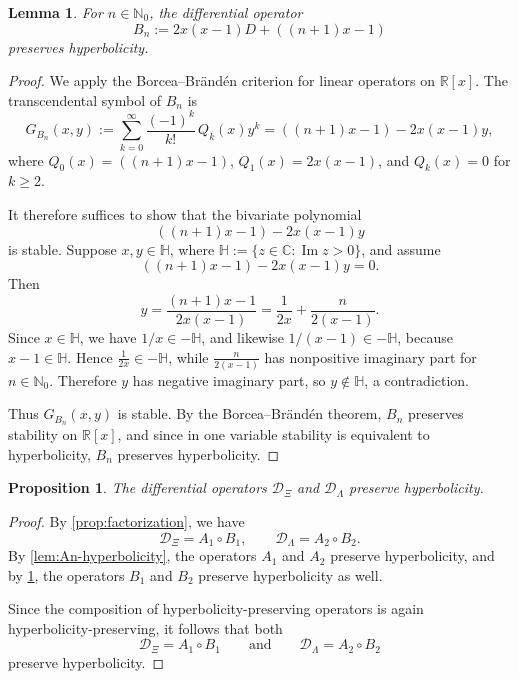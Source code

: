 \documentclass[11pt,twoside]{article}
\newtheorem{lemma}[theorem]{Lemma}
\newtheorem{proposition}[theorem]{Proposition}
\numberwithin{equation}{section}
\begin{document}
\begin{lemma}\label{lem:Bn-hyperbolicity}
For \(n\in\mathbb{N}_0\), the differential operator
\[
B_n:=2x(x-1)D+((n+1)x-1)
\]
preserves hyperbolicity.
\end{lemma}

\begin{proof}
We apply the Borcea--Br\"and\'en criterion for linear operators on \(\mathbb R[x]\). The transcendental symbol of \(B_n\) is
\[
G_{B_n}(x,y)
:=
\sum_{k=0}^\infty \frac{(-1)^k}{k!}\,Q_k(x)y^k
=
((n+1)x-1)-2x(x-1)y,
\]
where \(Q_0(x)=((n+1)x-1)\), \(Q_1(x)=2x(x-1)\), and \(Q_k(x)=0\) for \(k\ge2\).

It therefore suffices to show that the bivariate polynomial
\[
((n+1)x-1)-2x(x-1)y
\]
is stable. Suppose \(x,y\in\mathbb H\), where \(\mathbb H:=\{z\in\mathbb C:\operatorname{Im} z>0\}\), and assume
\[
((n+1)x-1)-2x(x-1)y=0.
\]
Then
\[
y=\frac{(n+1)x-1}{2x(x-1)}
=
\frac{1}{2x}+\frac{n}{2(x-1)}.
\]
Since \(x\in\mathbb H\), we have \(1/x\in-\mathbb H\), and likewise \(1/(x-1)\in-\mathbb H\), because \(x-1\in\mathbb H\). Hence \(\frac{1}{2x}\in-\mathbb H\), while \(\frac{n}{2(x-1)}\) has nonpositive imaginary part for \(n\in\mathbb N_0\). Therefore \(y\) has negative imaginary part, so \(y\notin\mathbb H\), a contradiction.

Thus \(G_{B_n}(x,y)\) is stable. By the Borcea--Br\"and\'en theorem, \(B_n\) preserves stability on \(\mathbb{R}[x]\), and since in one variable stability is equivalent to hyperbolicity, \(B_n\) preserves hyperbolicity.
\end{proof}

\begin{proposition}\label{prop:D-hyperbolicity}
The differential operators \(\mathcal D_{\Xi}\) and \(\mathcal D_{\Lambda}\) preserve hyperbolicity.
\end{proposition}

\begin{proof}
By \cref{prop:factorization}, we have
\[
\mathcal D_{\Xi}=A_1\circ B_1,
\qquad
\mathcal D_{\Lambda}=A_2\circ B_2.
\]
By \cref{lem:An-hyperbolicity}, the operators \(A_1\) and \(A_2\) preserve hyperbolicity, and by \cref{lem:Bn-hyperbolicity}, the operators \(B_1\) and \(B_2\) preserve hyperbolicity as well.

Since the composition of hyperbolicity-preserving operators is again hyperbolicity-preserving, it follows that both
\[
\mathcal D_{\Xi}=A_1\circ B_1
\qquad\text{and}\qquad
\mathcal D_{\Lambda}=A_2\circ B_2
\]
preserve hyperbolicity.
\end{proof}
\end{document}
